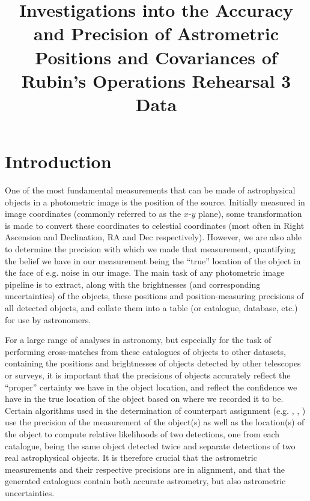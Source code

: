 \documentclass[SE,lsstdraft,authoryear,toc]{lsstdoc}
\title{Investigations into the Accuracy and Precision of Astrometric Positions and Covariances of Rubin's Operations Rehearsal 3 Data}
\date{\vcsDate}
\begin{document}
\maketitle

\section{Introduction}
\label{sec:intro}
One of the most fundamental measurements that can be made of astrophysical objects in a photometric image is the position of the source.
Initially measured in image coordinates (commonly referred to as the $x$-$y$ plane), some transformation is made to convert these coordinates to celestial coordinates (most often in Right Ascension and Declination, RA and Dec respectively).
However, we are also able to determine the precision with which we made that measurement, quantifying the belief we have in our measurement being the ``true'' location of the object in the face of e.g. noise in our image.
The main task of any photometric image pipeline is to extract, along with the brightnesses (and corresponding uncertainties) of the objects, these positions and position-measuring precisions of all detected objects, and collate them into a table (or catalogue, database, etc.) for use by astronomers.

For a large range of analyses in astronomy, but especially for the task of performing cross-matches from these catalogues of objects to other datasets, containing the positions and brightnesses of objects detected by other telescopes or surveys, it is important that the precisions of objects accurately reflect the ``proper'' certainty we have in the object location, and reflect the confidence we have in the true location of the object based on where we recorded it to be.
Certain algorithms used in the determination of counterpart assignment (e.g. \citealp{Budavari:2008aa}, \citealp{2018MNRAS.473.5570W}, \citealp{Pineau:2017aa}) use the precision of the measurement of the object(s) as well as the location(s) of the object to compute relative likelihoods of two detections, one from each catalogue, being the same object detected twice and separate detections of two real astrophysical objects.
It is therefore crucial that the astrometric measurements and their respective precisions are in alignment, and that the generated catalogues contain both accurate astrometry, but also astrometric uncertainties.
\end{document}
